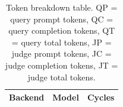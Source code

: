 \begin{table}[t]
\centering
\scriptsize
\begin{tabular}{lll}
\toprule
Backend & Model & Cycles \\
\midrule
\bottomrule
\end{tabular}
\caption{Token breakdown table. QP = query prompt tokens, QC = query completion tokens, QT = query total tokens, JP = judge prompt tokens, JC = judge completion tokens, JT = judge total tokens.}
\label{tab:srp-token-breakdown}
\end{table}
